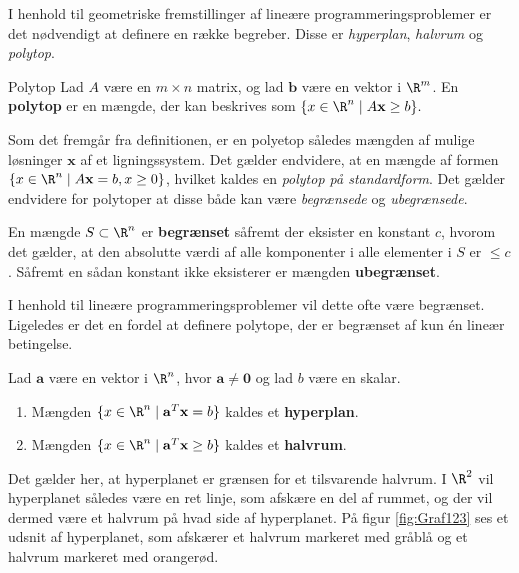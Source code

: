 I henhold til geometriske fremstillinger af lineære programmeringsproblemer er det nødvendigt at definere en række begreber.
Disse er \textit{hyperplan}, \textit{halvrum} og \textit{polytop}.
%
\begin{defn}{}{Polytop}
Lad $A$ være en $m \times n$ matrix, og lad $\mathbf{b}$ være en vektor i  $\R^m$.
En \textbf{polytop} er en mængde, der kan beskrives som 
$\{x\in \R^n \mid A\mathbf{x}\geq b\}.$
%
\end{defn}
\noindent
%
Som det fremgår fra definitionen, er en polyetop således mængden af mulige løsninger $\mathbf{x}$ af et ligningssystem.
Det gælder endvidere, at en mængde af formen $ \{x \in \R^n \mid A\textbf{x}=b,x \geq 0 \}$, hvilket kaldes en \textit{polytop på standardform}. 
%
Det gælder endvidere for polytoper at disse både kan være \textit{begrænsede} og \textit{ubegrænsede}.
%
\begin{defn}{}{}
En mængde $S \subset \R^n$ er \textbf{begrænset} såfremt der eksister en konstant $c$, hvorom det gælder, at den absolutte værdi af alle komponenter i alle elementer i $S$ er $\leq c$. 
Såfremt en sådan konstant ikke eksisterer er mængden \textbf{ubegrænset}. 
\end{defn}
\noindent
%
%
I henhold til lineære programmeringsproblemer vil dette ofte være begrænset.
Ligeledes er det en fordel at definere polytope, der er begrænset af kun én lineær betingelse. 
%
%
\begin{defn}{}{}
Lad $\mathbf{a}$ være en vektor i $\R^n$, hvor $\mathbf{a} \neq \mathbf{0}$ og lad $b$ være en skalar.
\begin{enumerate}[label=(\alph*)]
\item Mængden $\{x \in \R^n \mid \mathbf{a}^T \mathbf{x}=b\}$ kaldes et \textbf{hyperplan}.
\item Mængden $\{x \in \R^n \mid \mathbf{a}^T \mathbf{x} \geq b\}$ kaldes et \textbf{halvrum}.
\end{enumerate}
\end{defn}
\noindent
%
Det gælder her, at hyperplanet er grænsen for et tilsvarende halvrum.
I $\R^2$ vil hyperplanet således være en ret linje, som afskære en del af rummet, og der vil dermed være et halvrum på hvad side af hyperplanet.
På figur \ref{fig:Graf123} ses et udsnit af hyperplanet, som afskærer et halvrum markeret med gråblå og et halvrum markeret med orangerød. 

